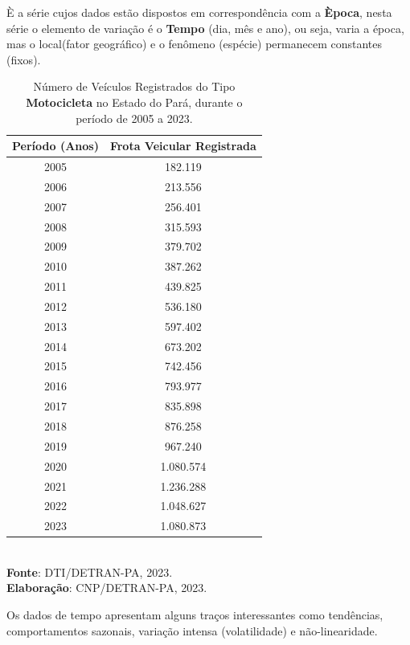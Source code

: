 È a série cujos dados estão dispostos em correspondência
com a \textbf{Època}, nesta série o elemento de variação é o \textbf{Tempo} (dia,
mês e ano), ou seja, varia a época, mas o local(fator geográfico) e o fenômeno (espécie)
permanecem constantes (fixos).


\begin{table}[!htb]
    \centering
    {
    \caption{Número de Veículos Registrados do Tipo \textbf{Motocicleta} no Estado do Pará, durante o período de 2005 a 2023.}
    \label{obitos}
    \vspace{0.1cm}
\begin{tabular}{c|c}
  \hline\hline
  Período (Anos)   & Frota Veicular Registrada \\
  \hline\hline
  2005   & 182.119   \\
  2006   & 213.556   \\
  2007   &  256.401  \\
  2008   &  315.593  \\
  2009   &  379.702 \\
  2010   & 387.262  \\
  2011   & 439.825 \\
  2012   & 536.180  \\
  2013   & 597.402  \\
  2014   & 673.202 \\
  2015   & 742.456 \\
  2016   & 793.977 \\
  2017   & 835.898 \\
  2018   & 876.258 \\
  2019   & 967.240 \\
  2020   & 1.080.574 \\
  2021   & 1.236.288 \\
  2022   & 1.048.627   \\
  2023   & 1.080.873    \\
  \hline\hline
\end{tabular}}
\\
\hspace{-2.5cm}
\textbf{Fonte}: DTI/DETRAN-PA, 2023. \\
\hspace{-1.6cm}
\textbf{Elaboração}: CNP/DETRAN-PA, 2023.
\end{table}


Os dados de tempo apresentam alguns traços interessantes como tendências, comportamentos sazonais, variação intensa (volatilidade) e não-linearidade.\vskip0.3cm



